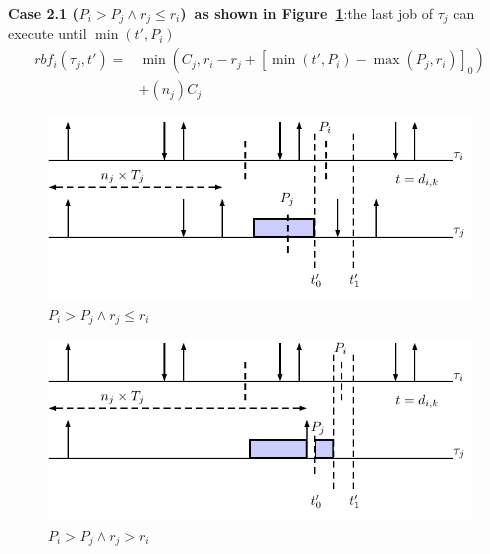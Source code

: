 \documentclass[12pt,conference,twocolumn]{IEEEtran}
\newcommand{\my}[1]{{\color{blue}{#1}}}
\begin{document}


\textbf{Case 2.1 ($P_i>P_j\wedge r_j\leq r_i$)~as shown in  Figure~\ref{fig:case5}}:the last job of $\tau_j$ can execute until $\min(t',P_i)$
	\begin{align*}
		rbf_i(\tau_j,t')=&\min\left(C_j,r_i-r_j+[\min(t',P_i)-\max(P_j,r_i)]_0\right)\\&+(n_j) C_j
	\end{align*}

\begin{figure}[h!]
 \centering
\includegraphics[scale=0.7]{Figure/C4}  
\caption{$P_i>P_j\wedge r_j\leq r_i$}
  \label{fig:case5}
\end{figure}

\begin{figure}[h!]
 \centering
\includegraphics[scale=0.7]{Figure/C41}  
\caption{$P_i>P_j\wedge r_j> r_i $}
  \label{fig:case6}
\end{figure}
\end{document}
